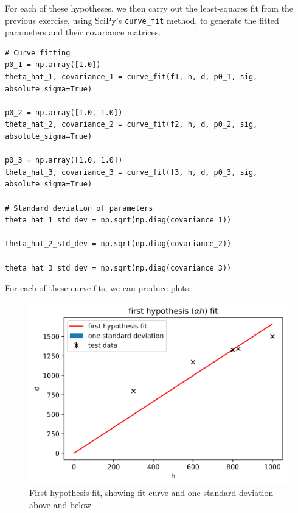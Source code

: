 \documentclass[a4paper]{article}
\begin{document}
For each of these hypotheses, we then carry out the least-squares fit from the previous exercise, using SciPy's \lstinline$curve_fit$ method, to generate the fitted parameters and their covariance matrices.
\newpage
\begin{lstlisting}
# Curve fitting
p0_1 = np.array([1.0])
theta_hat_1, covariance_1 = curve_fit(f1, h, d, p0_1, sig, absolute_sigma=True)

p0_2 = np.array([1.0, 1.0])
theta_hat_2, covariance_2 = curve_fit(f2, h, d, p0_2, sig, absolute_sigma=True)

p0_3 = np.array([1.0, 1.0])
theta_hat_3, covariance_3 = curve_fit(f3, h, d, p0_3, sig, absolute_sigma=True)

# Standard deviation of parameters
theta_hat_1_std_dev = np.sqrt(np.diag(covariance_1))

theta_hat_2_std_dev = np.sqrt(np.diag(covariance_2))

theta_hat_3_std_dev = np.sqrt(np.diag(covariance_3))
\end{lstlisting}
For each of these curve fits, we can produce plots:

\begin{figure}[h]
\centerline{\includegraphics[scale=0.7]{h1.png}}
\caption{First hypothesis fit, showing fit curve and one standard deviation above and below}
\label{fig:fit1}
\end{figure}
\end{document}
